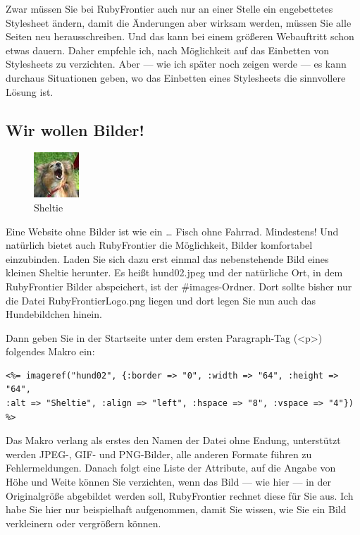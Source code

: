 \documentclass[11pt]{report}
\begin{document}
Zwar müssen Sie bei RubyFrontier auch nur an einer Stelle ein
engebettetes Stylesheet ändern, damit die Änderungen aber wirksam
werden, müssen Sie alle Seiten neu herausschreiben. Und das kann bei
einem größeren Webauftritt schon etwas dauern. Daher empfehle ich,
nach Möglichkeit auf das Einbetten von Stylesheets zu verzichten. Aber
— wie ich später noch zeigen werde — es kann durchaus Situationen
geben, wo das Einbetten eines Stylesheets die sinnvollere Lösung ist.
\subsection{Wir wollen Bilder!}
\label{sec-2-1-1-3}


\begin{figure}[h!]
\centering
\includegraphics[width 2cm]{./images/hund02.jpg}
\caption{\label{hund02}Sheltie}
\end{figure}


Eine Website ohne Bilder ist wie ein … Fisch ohne Fahrrad. Mindestens!
Und natürlich bietet auch RubyFrontier die Möglichkeit, Bilder
komfortabel einzubinden. Laden Sie sich dazu erst einmal das
nebenstehende Bild eines kleinen Sheltie herunter. Es heißt
hund02.jpeg und der natürliche Ort, in dem RubyFrontier Bilder
abspeichert, ist der \#images-Ordner. Dort sollte bisher nur die Datei
RubyFrontierLogo.png liegen und dort legen Sie nun auch das
Hundebildchen hinein.


Dann geben Sie in der Startseite unter dem ersten Paragraph-Tag (<p>)
folgendes Makro ein:


\begin{verbatim}
<%= imageref("hund02", {:border => "0", :width => "64", :height => "64",
:alt => "Sheltie", :align => "left", :hspace => "8", :vspace => "4"})
%>
\end{verbatim}

Das Makro verlang als erstes den Namen der Datei ohne Endung,
unterstützt werden JPEG-, GIF- und PNG-Bilder, alle anderen Formate
führen zu Fehlermeldungen. Danach folgt eine Liste der Attribute, auf
die Angabe von Höhe und Weite können Sie verzichten, wenn das Bild —
wie hier — in der Originalgröße abgebildet werden soll, RubyFrontier
rechnet diese für Sie aus. Ich habe Sie hier nur beispielhaft
aufgenommen, damit Sie wissen, wie Sie ein Bild verkleinern oder
vergrößern können.
\end{document}

